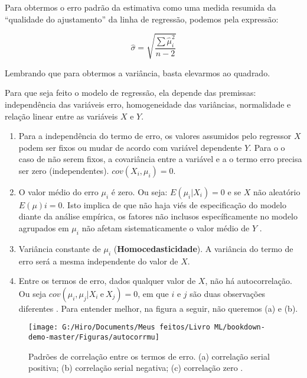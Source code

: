 \documentclass[
]{book}
\begin{document}
Para obtermos o erro padrão da estimativa como uma medida resumida da ``qualidade do ajustamento'' da linha de regressão, podemos pela expressão:

\begin{equation}
\hat{\sigma}=\sqrt{\frac{\sum \hat{\mu}_i^2}{n-2}}
\label{eq:desvioreg}
\end{equation}

Lembrando que para obtermos a variância, basta elevarmos ao quadrado.

Para que seja feito o modelo de regressão, ela depende das premissas: independência das variáveis erro, homogeneidade das variâncias, normalidade e relação linear entre as variáveis \(X\) e \(Y\).

\begin{enumerate}
\def\labelenumi{\arabic{enumi}.}
\item
  Para a independência do termo de erro, os valores assumidos pelo regressor \(X\) podem ser fixos ou mudar de acordo com variável dependente \(Y\). Para o o caso de não serem fixos, a covariância entre a variável e a o termo erro precisa ser zero (independentes). \(cov(X_i,\mu_i)=0\).
\item
  O valor médio do erro \(\mu_i\) é zero. Ou seja: \(E(\mu_i|X_i)=0\) e se \(X\) não aleatório \(E(\mu)i=0\). Isto implica de que não haja viés de especificação do modelo diante da análise empírica, os fatores não inclusos específicamente no modelo agrupados em \(\mu_i\) não afetam sistematicamente o valor médio de \(Y\) \citep{gujarati2011econometria}.
\item
  Variância constante de \(\mu_i\) (\textbf{Homocedasticidade}). A variância do termo de erro será a mesma independente do valor de \(X\).
\item
  Entre os termos de erro, dados qualquer valor de \(X\), não há autocorrelação. Ou seja \(cov(\mu_i,\mu_j|X_i \ \mbox{e} \ X_j)=0\), em que \(i\) e \(j\) são duas observações diferentes \citep{gujarati2011econometria}. Para entender melhor, na figura a seguir, não queremos (a) e (b).
\end{enumerate}

\begin{figure}

{\centering \texttt{[image: G:/Hiro/Documents/Meus feitos/Livro ML/bookdown-demo-master/Figuras/autocorrmu]} 

}

\caption{Padrões de correlação entre os termos de erro. (a) correlação serial positiva; (b) correlação serial negativa; (c) correlação zero \citet{gujarati2011econometria}.}\label{fig:autocorrmu}
\end{figure}
\end{document}
